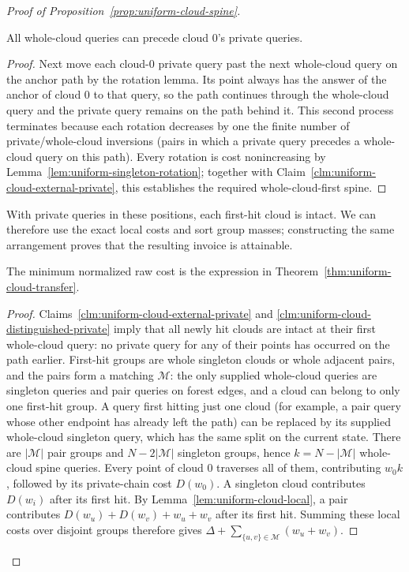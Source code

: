 \begin{proof}[Proof of Proposition~\ref{prop:uniform-cloud-spine}]
\begin{claim}
\label{clm:uniform-cloud-distinguished-private}
All whole-cloud queries can precede cloud $0$'s private queries.
\end{claim}
\begin{proof}
Next move each cloud-$0$ private query past the next whole-cloud
query on the anchor path by the rotation lemma. Its point always has
the answer of the anchor of cloud $0$ to that query, so the path
continues through the whole-cloud query and the private query remains
on the path behind it. This second process terminates because each
rotation decreases by one the finite number of private/whole-cloud
inversions (pairs in which a private query precedes a whole-cloud
query on this path).
Every rotation is cost nonincreasing by
Lemma~\ref{lem:uniform-singleton-rotation}; together with
Claim~\ref{clm:uniform-cloud-external-private}, this establishes the
required whole-cloud-first spine.

\end{proof}
With private queries in these positions, each first-hit cloud is
intact. We can therefore use the exact local costs and sort group
masses; constructing the same arrangement proves that the resulting
invoice is attainable.

\begin{claim}
\label{clm:uniform-cloud-invoice}
The minimum normalized raw cost is the expression in Theorem~\ref{thm:uniform-cloud-transfer}.
\end{claim}
\begin{proof}
Claims~\ref{clm:uniform-cloud-external-private} and
\ref{clm:uniform-cloud-distinguished-private} imply that all newly
hit clouds are intact at their first
whole-cloud query: no private query for any of their points
has occurred on the path earlier. First-hit groups are whole
singleton clouds or whole adjacent pairs, and the pairs form
a matching $\mathcal M$: the only supplied whole-cloud queries are
singleton queries and pair queries on forest edges, and a cloud can
belong to only one first-hit group. A query first hitting just one
cloud (for example, a pair query whose other endpoint has already
left the path) can be replaced by its supplied whole-cloud singleton query,
which has the same split on the current state. There are $|\mathcal M|$ pair groups and
$N-2|\mathcal M|$ singleton groups, hence
$k=N-|\mathcal M|$ whole-cloud spine queries. Every point of cloud
$0$ traverses all of them, contributing $w_0k$, followed by its
private-chain cost $D(w_0)$. A singleton cloud contributes $D(w_i)$
after its first hit. By Lemma~\ref{lem:uniform-cloud-local}, a pair
contributes $D(w_u)+D(w_v)+w_u+w_v$ after its first hit. Summing
these local costs over disjoint groups therefore gives
$\Delta+\sum_{\{u,v\}\in\mathcal M}(w_u+w_v)$.


\end{proof}
\end{proof}
